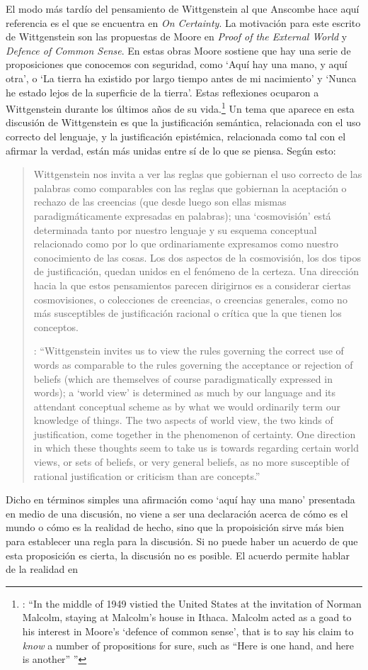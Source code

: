 El modo más tardío del pensamiento de Wittgenstein al que Anscombe hace aquí referencia es el que se encuentra en \emph{On Certainty}. La motivación para este escrito de Wittgenstein son las propuestas de Moore en \emph{Proof of the External World} y \emph{Defence of Common Sense}. En estas obras Moore sostiene que hay una serie de proposiciones que conocemos con seguridad, como \enquote*{Aquí hay una mano, y aquí otra}, o \enquote*{La tierra ha existido por largo tiempo antes de mi nacimiento} y \enquote*{Nunca he estado lejos de la superficie de la tierra}. Estas reflexiones ocuparon a Wittgenstein durante los últimos años de su vida.\footnote{\cite[Cf.~][vi]{wittgenstein1969oncert}: \enquote{In the middle of 1949  vistied the United States at the invitation of Norman Malcolm, staying at Malcolm's house in Ithaca. Malcolm acted as a goad to his interest in Moore's `defence of common sense', that is to say his claim to \emph{know} a number of propositions for sure, such as ``Here is one hand, and here is another'' \textelp{}}} Un tema que aparece en esta discusión de Wittgenstein es que la justificación semántica, relacionada con el uso correcto del lenguaje, y la justificación epistémica, relacionada como tal con el afirmar la verdad, están más unidas entre sí de lo que se piensa. Según esto:\blockquote[{\cite[213]{teichmann2008ans}}: \enquote{Wittgenstein invites us to view the rules governing the correct use of words as comparable to the rules governing the acceptance or rejection of beliefs (which are themselves of course paradigmatically expressed in words); a ‘world view’ is determined as much by our language and its attendant conceptual scheme as by what we would ordinarily term our knowledge of things. The two aspects of world view, the two kinds of justification, come together in the phenomenon of certainty. \textelp{} One direction in which these thoughts seem to take us is towards regarding certain world views, or sets of beliefs, or very general beliefs, as no more susceptible of rational justification or criticism than are concepts.}]{Wittgenstein nos invita a ver las reglas que gobiernan el uso correcto de las palabras como comparables con las reglas que gobiernan la aceptación o rechazo de las creencias (que desde luego son ellas mismas paradigmáticamente expresadas en palabras); una `cosmovisión' está determinada tanto por nuestro lenguaje y su esquema conceptual relacionado como por lo que ordinariamente expresamos como nuestro conocimiento de las cosas. Los dos aspectos de la cosmovisión, los dos tipos de justificación, quedan unidos en el fenómeno de la certeza. \textelp{} Una dirección hacia la que estos pensamientos parecen dirigirnos es a considerar ciertas cosmovisiones, o colecciones de creencias, o creencias generales, como no más susceptibles de justificación racional o crítica que la que tienen los conceptos.} Dicho en términos simples una afirmación como \enquote*{aquí hay una mano} presentada en medio de una discusión, no viene a ser una declaración acerca de cómo es el mundo o cómo es la realidad de hecho, sino que la propoisición sirve más bien para establecer una regla para la discusión. Si no puede haber un acuerdo de que esta proposición es cierta, la discusión no es posible. El acuerdo permite hablar de la realidad en 